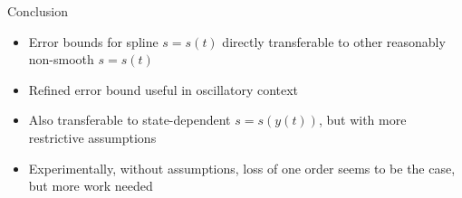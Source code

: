\documentclass{beamer}
\begin{document}
\begin{frame}{Conclusion}
  \begin{itemize}
    \item Error bounds for spline $s = s(t)$ directly transferable to other reasonably non-smooth $s = s(t)$
    \item Refined error bound useful in oscillatory context
    \item Also transferable to state-dependent $s = s(y(t))$, but with more restrictive assumptions
    \item Experimentally, without assumptions, loss of one order seems to be the case, but more work needed
  \end{itemize}
\end{frame}
\end{document}
